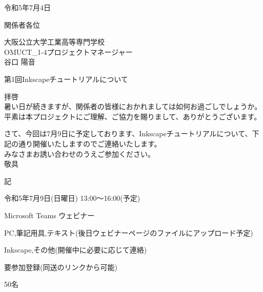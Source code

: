 \documentclass{ltjsarticle}
\begin{document}
\begin{flushright}
    令和5年7月4日
\end{flushright}
\begin{flushleft}
    関係者各位
\end{flushleft}
\begin{flushright}
    大阪公立大学工業高等専門学校\\
    OMUCT\_1-4プロジェクトマネージャー\\
    谷口 陽音
\end{flushright}
\begin{center}
    \begin{Large}
	第1回Inkscapeチュートリアルについて
    \end{Large}
\end{center}
拝啓\\
暑い日が続きますが、関係者の皆様におかれましては如何お過ごしでしょうか。\\
平素は本プロジェクトにご理解、ご協力を賜りまして、ありがとうございます。

さて、今回は7月9日に予定しております、Inkscapeチュートリアルについて、下記の通り開催いたしますのでご連絡いたします。\\
みなさまお誘い合わせのうえご参加ください。\\
敬具

\begin{center}
    記
\end{center}
\begin{description}[labelwidth=6em]
    \item[日時] 令和5年7月9日(日曜日) 13:00〜16:00(予定)
    \item[ツール] Microsoft Teams ウェビナー
    \item[準備物] PC,筆記用具,テキスト(後日ウェビナーページのファイルにアップロード予定)
    \item[必要なソフト] Inkscape,その他(開催中に必要に応じて連絡)
    \item[その他] 要参加登録(同送のリンクから可能)
    \item[最大対応人数] 50名
\end{description}
\end{document}
